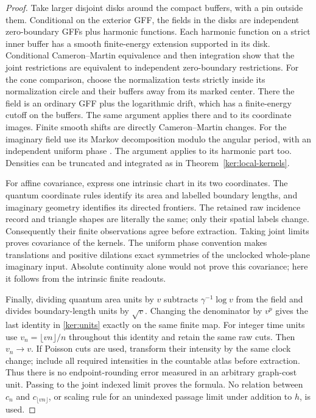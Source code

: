 \begin{proof}
Take larger disjoint disks around the compact buffers, with a pin
outside them.  Conditional on the exterior GFF, the fields in the
disks are independent zero-boundary GFFs plus harmonic functions.
Each harmonic function on a strict inner buffer has a smooth
finite-energy extension supported in its disk.  Conditional
Cameron--Martin equivalence and then integration show that the joint
restrictions are equivalent to independent zero-boundary restrictions.
For the cone comparison, choose the normalization tests strictly
inside its normalization circle and their buffers away from its
marked center.  There the field is an ordinary GFF plus the
logarithmic drift, which has a finite-energy cutoff on the buffers.
The same argument applies there and to its coordinate images.  Finite smooth shifts are directly Cameron--Martin changes.
For the imaginary field use its Markov decomposition modulo the
angular period, with an independent uniform phase
\cite[Propositions~2.8, 2.9 and~2.11]{MillerSheffieldIGIV}.  The argument applies to
its harmonic part too.  Densities can be truncated and integrated as
in Theorem~\ref{ker:local-kernels}.

For affine covariance, express one intrinsic chart in its two
coordinates.  The quantum coordinate rules identify its area and
labelled boundary lengths, and imaginary geometry identifies its
directed frontiers.  The retained raw incidence record and triangle
shapes are literally the same; only their spatial labels change.
Consequently their finite observations agree before extraction.
Taking joint limits proves covariance of the kernels.  The uniform
phase convention makes translations and positive dilations exact
symmetries of the unclocked whole-plane imaginary input.  Absolute
continuity alone would not prove this covariance; here it follows
from the intrinsic finite readouts.

Finally, dividing quantum area units by \(v\) subtracts
\(\gamma^{-1}\log v\) from the field and divides boundary-length
units by \(\sqrt v\).  Changing the denominator by \(v^p\) gives the
last identity in \eqref{ker:units} exactly on the same finite map.
For integer time units use \(v_n=\lfloor vn\rfloor/n\) throughout
this identity and retain the same raw cuts.  Then \(v_n\to v\).
If Poisson cuts are used, transform their intensity by the same
clock change; include all required intensities in the countable
atlas before extraction.  Thus there is no endpoint-rounding error
measured in an arbitrary graph-cost unit.  Passing to the joint
indexed limit proves the formula.  No relation between \(c_n\) and
\(c_{\lfloor vn\rfloor}\), or scaling rule for an unindexed passage
limit under addition to \(h\), is used.
\end{proof}

